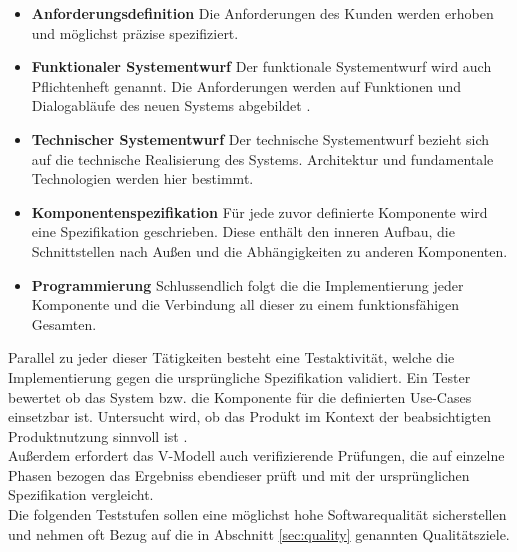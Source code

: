 \begin{itemize}
\item \textbf{Anforderungsdefinition} Die Anforderungen des Kunden werden erhoben und möglichst präzise spezifiziert.
\item \textbf{Funktionaler Systementwurf} Der funktionale Systementwurf wird auch Pflichtenheft genannt. Die Anforderungen werden auf Funktionen und Dialogabläufe des neuen Systems abgebildet \cite{spillner_basiswissen_2012}.
\item \textbf{Technischer Systementwurf} Der technische Systementwurf bezieht sich auf die technische Realisierung des Systems. Architektur und fundamentale Technologien werden hier bestimmt.
\item \textbf{Komponentenspezifikation} Für jede zuvor definierte Komponente wird eine Spezifikation geschrieben. Diese enthält den inneren Aufbau, die Schnittstellen nach Außen und die Abhängigkeiten zu anderen Komponenten.
\item \textbf{Programmierung} Schlussendlich folgt die die Implementierung jeder Komponente und die Verbindung all dieser zu einem funktionsfähigen Gesamten.
\end{itemize}

Parallel zu jeder dieser Tätigkeiten besteht eine Testaktivität, welche die Implementierung gegen die ursprüngliche Spezifikation validiert. Ein Tester bewertet ob das System bzw. die Komponente für die definierten Use-Cases einsetzbar ist. Untersucht wird, ob das Produkt im Kontext der beabsichtigten Produktnutzung sinnvoll ist \cite{spillner_basiswissen_2012}.\\
Außerdem erfordert das V-Modell auch verifizierende Prüfungen, die auf einzelne Phasen bezogen das Ergebniss ebendieser prüft und mit der ursprünglichen Spezifikation vergleicht.\\
Die folgenden Teststufen sollen eine möglichst hohe Softwarequalität sicherstellen und nehmen oft Bezug auf die in Abschnitt \ref{sec:quality} genannten Qualitätsziele.


